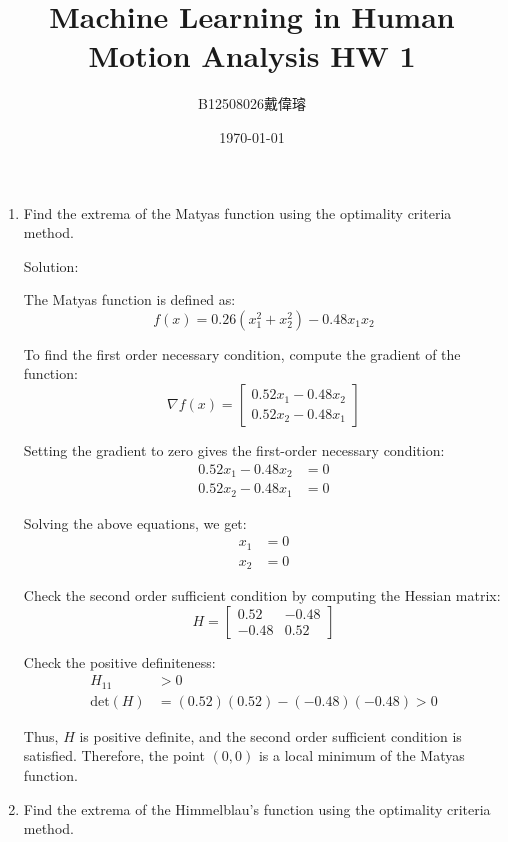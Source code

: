 \documentclass[12pt,a4paper]{article}
\title{Machine Learning in Human Motion Analysis HW 1}
\author{B12508026戴偉璿}
\date{\today}
\begin{document}
\maketitle


\begin{enumerate}
    \item Find the extrema of the Matyas function using the optimality criteria method.
    
    {\color{blue}
    Solution:

    The Matyas function is defined as:
    $$f(x) = 0.26(x_1^2 + x_2^2) - 0.48x_1x_2$$

    To find the first order necessary condition, compute the gradient of the function:
    $$\nabla f(x) = \begin{bmatrix}0.52x_1 - 0.48x_2 \\ 0.52x_2 - 0.48x_1\end{bmatrix}$$

    Setting the gradient to zero gives the first-order necessary condition:
    \begin{align*}
    0.52x_1 - 0.48x_2 &= 0 \\
    0.52x_2 - 0.48x_1 &= 0
    \end{align*}

    Solving the above equations, we get:
    \begin{align*}
    x_1 &= 0 \\
    x_2 &= 0
    \end{align*}

    Check the second order sufficient condition by computing the Hessian matrix:
    $$H = \begin{bmatrix}0.52 & -0.48 \\ -0.48 & 0.52\end{bmatrix}$$

    Check the positive definiteness:
    \begin{align*}
    H_{11} & > 0 \\
    \text{det}(H) &= (0.52)(0.52) - (-0.48)(-0.48)  > 0
    \end{align*}

    Thus, $H$ is positive definite, and the second order sufficient condition is satisfied. Therefore, the point $(0, 0)$ is a local minimum of the Matyas function.
    }

    \item Find the extrema of the Himmelblau's function using the optimality criteria method.


\end{enumerate}
\end{document}
